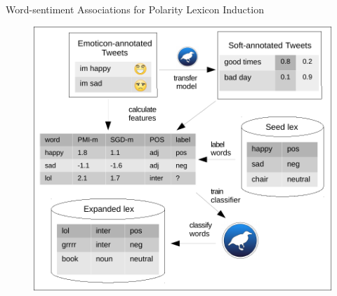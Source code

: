 \documentclass[handout]{beamer}
\begin{document}
\begin{frame}{Word-sentiment Associations for Polarity Lexicon Induction}
\begin{figure}[htb]
	\centering
	 \includegraphics[scale=0.5]{pics/diagramcrop.pdf}
	\label{fig:sosgd}
\end{figure}
\end{frame}
\end{document}
